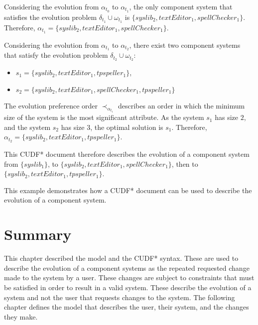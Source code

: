 Considering the evolution from $\alpha_{t_0}$ to $\alpha_{t_1}$,
the only component system that satisfies the evolution problem $\delta_{t_1} \cup \omega_{t_1}$
is $\{syslib_2, textEditor_1, spellChecker_1\}$.
Therefore, $\alpha_{t_1} = \{syslib_2, textEditor_1, spellChecker_1\}$.

Considering the evolution from $\alpha_{t_1}$ to $\alpha_{t_2}$,
there exist two component systems that satisfy the evolution problem $\delta_{t_2} \cup \omega_{t_2}$:
\begin{itemize}
  \item $s_1 = \{syslib_2, textEditor_1, tpspeller_1\}$,
  \item $s_2 = \{syslib_2, textEditor_1, spellChecker_1, tpspeller_1\}$
\end{itemize}

The evolution preference order $\prec_{\alpha_{t_1}}$ describes an order in which the minimum size of the system is the most significant attribute.
As the system $s_1$ has size $2$, and the system $s_2$ has size $3$, the optimal solution is $s_1$.
Therefore, $\alpha_{t_2} = \{syslib_2, textEditor_1, tpspeller_1\}$.

This CUDF* document therefore describes the evolution of a component system from 
$\{syslib_1\}$, to $\{syslib_2, textEditor_1, spellChecker_1\}$, then to $\{syslib_2, textEditor_1, tpspeller_1\}$.

This example demonstrates how a CUDF* document can be used to describe the evolution of a component system. 

\section{Summary}
This chapter described the \modelname model and the CUDF* syntax. 
These are used to describe the evolution of a component systems as the repeated requested change made to the system by a user.
These changes are subject to constraints that must be satisfied in order to result in a valid system.
These describe the evolution of a system and not the user that requests changes to the system.
The following chapter defines the \usermodel model that describes the user, their system, and the changes they make.

